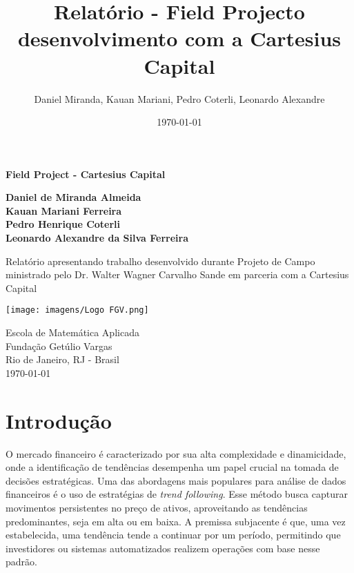 \documentclass{article}
\title{Relatório - Field Projecto desenvolvimento com a Cartesius Capital}
\author{Daniel Miranda, Kauan Mariani, Pedro Coterli, Leonardo Alexandre}
\date{\today}
\begin{document}
\begin{titlepage}
    \begin{center}            
        \Huge
        \textbf{Field Project - Cartesius Capital}
            
        \vspace{0.5cm}
        \LARGE
            
        \vspace{3.0cm}

        \textbf{Daniel de Miranda Almeida}\\
        \textbf{Kauan Mariani Ferreira}\\
        \textbf{Pedro Henrique Coterli}\\
        \textbf{Leonardo Alexandre da Silva Ferreira}

        \vspace{3.0cm}
            
            
        Relatório apresentando trabalho desenvolvido durante Projeto de Campo ministrado pelo Dr. Walter Wagner Carvalho Sande em parceria com a Cartesius Capital
            
        \vspace{1.0cm}
            
        \texttt{[image: imagens/Logo FGV.png]}
            
        \Large
        Escola de Matemática Aplicada\\
        Fundação Getúlio Vargas\\
        Rio de Janeiro, RJ - Brasil\\
        \today
            
    \end{center}
\end{titlepage}
\newpage

\tableofcontents
\newpage

\section{Introdução}

O mercado financeiro é caracterizado por sua alta complexidade e dinamicidade, onde a identificação de tendências desempenha um papel crucial na tomada de decisões estratégicas. Uma das abordagens mais populares para análise de dados financeiros é o uso de estratégias de \textit{trend following}. Esse método busca capturar movimentos persistentes no preço de ativos, aproveitando as tendências predominantes, seja em alta ou em baixa. A premissa subjacente é que, uma vez estabelecida, uma tendência tende a continuar por um período, permitindo que investidores ou sistemas automatizados realizem operações com base nesse padrão.
\end{document}
